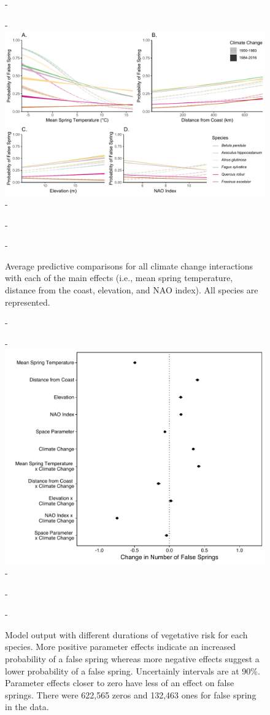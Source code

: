 \documentclass{article}\usepackage[]{graphicx}\usepackage[]{color}
\begin{document}
{\begin{figure} [H]
  -\begin{center}
  -\includegraphics[width=16cm]{..//figures/APC_allpred_allspp_baseR.pdf}
  -\caption{Average predictive comparisons for all climate change interactions with each of the main effects (i.e., mean spring temperature, distance from the coast, elevation, and NAO index). All species are represented. }\label{fig:suppapc}
  -\end{center}
  -\end{figure}}
  
  {\begin{figure} [H]
  -\begin{center}
  -\includegraphics[width=12cm]{..//figures/model_output_dvr_90.pdf}
  -\caption{Model output with different durations of vegetative risk for each species. More positive parameter effects indicate an increased probability of a false spring whereas more negative effects suggest a lower probability of a false spring. Uncertainly intervals are at 90\%. Parameter effects closer to zero have less of an effect on false springs. There were 622,565 zeros and 132,463 ones for false spring in the data.}\label{fig:dvr}
  -\end{center}
  -\end{figure}}
\end{document}
